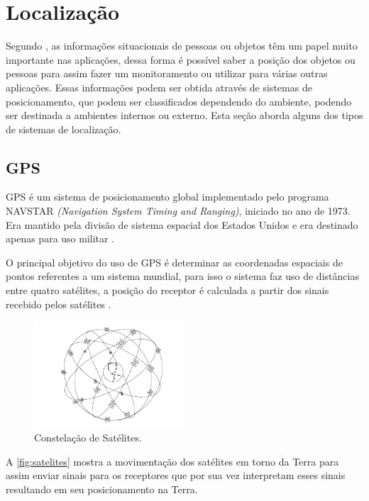 \section{Localização}
\par
Segundo , as informações situacionais de pessoas ou objetos têm um papel muito importante nas aplicações, dessa forma é possível saber a posição dos objetos ou pessoas para assim fazer um monitoramento ou utilizar para várias outras aplicações. Essas informações podem ser obtida através de sistemas de posicionamento, que podem ser classificados dependendo do ambiente, podendo ser destinada a ambientes internos ou externo. Esta seção aborda alguns dos tipos de sistemas de localização.
    \subsection{GPS}
    \par
    GPS é um sistema de posicionamento global implementado pelo programa NAVSTAR \textit{(Navigation System Timing and Ranging)}, iniciado no ano de 1973. Era mantido pela divisão de sistema espacial dos Estados Unidos e era destinado apenas para uso militar \cite{gpsEduardo2005}.
    \par
   O principal objetivo do uso de GPS é determinar as coordenadas espaciais de pontos referentes a um sistema mundial, para isso o sistema faz uso de distâncias entre quatro satélites, a posição do receptor é calculada a partir dos sinais recebido pelos satélites \cite{gpsEduardo2005}.

   \begin{figure}[H]
              \caption{\label{fig:satelites}{Constelação de Satélites.}}
              \centering
              \includegraphics[width=0.5\textwidth]{Figuras/gps_satelites.PNG}
        \end{figure}
        \par
        A  \autoref{fig:satelites} mostra a movimentação dos satélites em torno da Terra para assim enviar sinais para os receptores que por sua vez interpretam esses sinais resultando em seu posicionamento na Terra.
 
